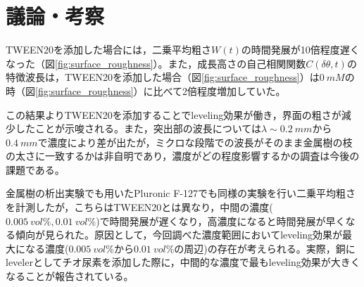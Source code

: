 \documentclass[autodetect-engine,dvi=dvipdfmx,a4paper,ja=standard,oneside,openany,11pt,draft]{bxjsbook}
\begin{document}
\section{議論・考察}
TWEEN20を添加した場合には，二乗平均粗さ$W(t)$の時間発展が10倍程度遅くなった（図\ref{fig:surface_roughness}）。また，成長高さの自己相関関数$C(\delta\theta,t)$の特徴波長は，TWEEN20を添加した場合（図\ref{fig:surface_roughness}）は$\SI{0}{mM}$の時（図\ref{fig:surface_roughness}）に比べて2倍程度増加していた。

この結果よりTWEEN20を添加することでleveling効果が働き，界面の粗さが減少したことが示唆される。また，突出部の波長については$\lambda\sim\SI{0.2}{mm}$から$\SI{0.4}{mm}$で濃度により差が出たが，ミクロな段階での波長がそのまま金属樹の枝の太さに一致するかは非自明であり，濃度がどの程度影響するかの調査は今後の課題である。

金属樹の析出実験でも用いたPluronic F-127でも同様の実験を行い二乗平均粗さを計測したが，こちらはTWEEN20とは異なり，中間の濃度($\SI{0.005}{vol\%},\SI{0.01}{vol\%}$)で時間発展が遅くなり，高濃度になると時間発展が早くなる傾向が見られた。原因として，今回調べた濃度範囲においてleveling効果が最大になる濃度($\SI{0.005}{vol\%}$から$\SI{0.01}{vol\%}$の周辺)の存在が考えられる。実際，銅にlevelerとしてチオ尿素を添加した際に，中間的な濃度で最もleveling効果が大きくなることが報告されている\cite{schilardi2000stable}。

\ifdraft{
  
  
}{}
\end{document}
